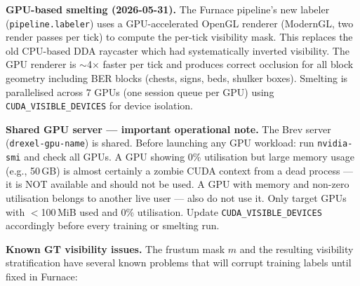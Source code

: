 \documentclass[11pt,a4paper]{article}
\begin{document}
\textbf{GPU-based smelting (2026-05-31).} The Furnace pipeline's new labeler (\texttt{pipeline.labeler}) uses a GPU-accelerated OpenGL renderer (ModernGL, two render passes per tick) to compute the per-tick visibility mask. This replaces the old CPU-based DDA raycaster which had systematically inverted visibility. The GPU renderer is $\sim$4$\times$ faster per tick and produces correct occlusion for all block geometry including BER blocks (chests, signs, beds, shulker boxes). Smelting is parallelised across 7 GPUs (one session queue per GPU) using \texttt{CUDA\_VISIBLE\_DEVICES} for device isolation.

\textbf{Shared GPU server — important operational note.} The Brev server (\texttt{drexel-gpu-name}) is shared. Before launching any GPU workload: run \texttt{nvidia-smi} and check all GPUs. A GPU showing 0\% utilisation but large memory usage (e.g., 50\,GB) is almost certainly a zombie CUDA context from a dead process --- it is NOT available and should not be used. A GPU with memory and non-zero utilisation belongs to another live user --- also do not use it. Only target GPUs with $<$100\,MiB used and 0\% utilisation. Update \texttt{CUDA\_VISIBLE\_DEVICES} accordingly before every training or smelting run.

\textbf{Known GT visibility issues.} The frustum mask $m$ and the resulting visibility stratification have several known problems that will corrupt training labels until fixed in Furnace:
\end{document}
